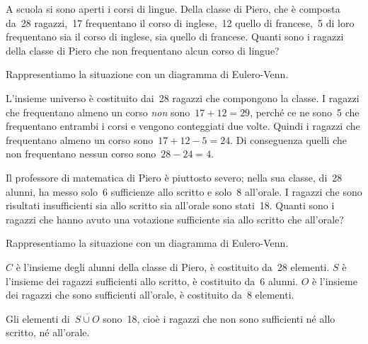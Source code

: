 {\begin{esempio}
 A scuola si sono aperti i corsi di lingue. Della classe di Piero, che è 
 composta da~28 ragazzi,~17 frequentano il corso di inglese,~12
quello di francese,~5 di loro frequentano sia il corso di inglese, sia 
quello di francese. Quanti sono i ragazzi della classe di Piero che non
frequentano alcun corso di lingue?

Rappresentiamo la situazione con un diagramma di Eulero-Venn.

\begin{minipage}{.59 \textwidth}
L'insieme universo è costituito dai~28 ragazzi che
compongono la classe. I ragazzi che frequentano almeno un corso \emph{non} 
sono~\(17+12=29\), perché ce ne sono~5 che frequentano entrambi i corsi e
vengono conteggiati due volte. Quindi i ragazzi che frequentano almeno un 
corso sono~\(17+12-5=24\). Di conseguenza quelli che non frequentano
nessun corso sono~\(28-24=4\).
\end{minipage}
\hfill
\begin{minipage}{.39 \textwidth}
\begin{center}
 
 \end{center}
\end{minipage}
\end{esempio}

\begin{esempio}
 Il professore di matematica di Piero è piuttosto severo; nella sua classe, 
 di~28 alunni, ha messo solo~6 sufficienze allo scritto e solo~8 all'orale. 
 I ragazzi che sono risultati insufficienti sia allo scritto sia 
all'orale sono stati~18. 
Quanti sono i ragazzi che hanno avuto una votazione sufficiente sia allo 
scritto che all'orale?

Rappresentiamo la situazione con un diagramma di Eulero-Venn.

\begin{minipage}{.59 \textwidth}
\(C\) è l'insieme degli alunni della classe di Piero, è costituito da~28 
elementi. \(S\) è l'insieme dei ragazzi sufficienti allo scritto, 
è costituito da~6 alunni. \(O\) è l'insieme dei ragazzi che sono sufficienti
all'orale, è costituito da~8 elementi.

Gli elementi di~\(\overline{{S\cup O}}\) sono~18, cioè i ragazzi che
non sono sufficienti né allo scritto, né all'orale.
\end{minipage}
\hfill
\begin{minipage}{.39 \textwidth}
\begin{center}
 
\end{center}
\end{minipage}


\end{esempio}}
